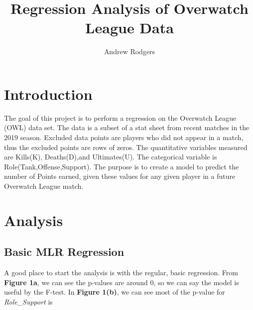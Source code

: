 \documentclass[10pt,letterpaper]{article}
\title{\huge{Regression Analysis of Overwatch League Data}}
\author{\large{Andrew Rodgers}}
\date{}
\begin{document}
	\maketitle
	\section{Introduction}
	The goal of this project is to perform a regression on the Overwatch League (OWL) data set. The data is a subset of a stat sheet from recent matches in the 2019 season. Excluded data points are players who did not appear in a match, thus the excluded points are rows of zeros. The quantitative variables measured are Kills(K), Deaths(D),and Ultimates(U). The categorical variable is  Role(Tank,Offense,Support). The purpose is to create a model to predict the number of Points earned, given these values for any given player in a future Overwatch League match.
	
	\section{Analysis}
	\subsection{Basic MLR Regression}
	A good place to start the analysis is with the regular, basic regression. From \textbf{Figure 1a}, we can see the p-values are around 0, so we can say the model is useful by the F-test. In \textbf{Figure 1(b)}, we can see most of the p-value for \textit{Role\_Support} is 
	\begin{figure}[h]
		\caption{}
	\end{figure}
	\FloatBarrier
\end{document}
